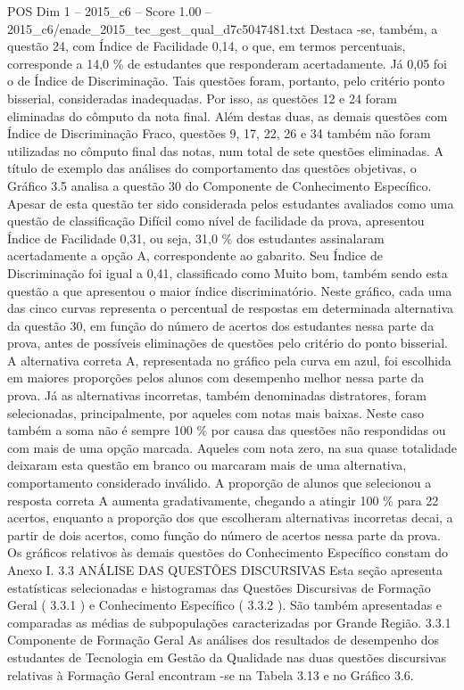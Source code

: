 \begin{textsample}{POS Dim 1 – 2015\_c6 – Score 1.00 – 2015\_c6/enade\_2015\_tec\_gest\_qual\_d7c5047481.txt}
Destaca -se, também, a questão 24, com Índice de Facilidade 0,14, o que, em termos percentuais, corresponde a 14,0 \% de estudantes que responderam acertadamente.
Já 0,05 foi o de Índice de Discriminação.
Tais questões foram, portanto, pelo critério ponto bisserial, consideradas inadequadas.
Por isso, as questões 12 e 24 foram eliminadas do cômputo da nota final.
Além destas duas, as demais questões com Índice de Discriminação Fraco, questões 9, 17, 22, 26 e 34 também não foram utilizadas no cômputo final das notas, num total de sete questões eliminadas.
A título de exemplo das análises do comportamento das questões objetivas, o Gráfico 3.5 analisa a questão 30 do Componente de Conhecimento Específico.
Apesar de esta questão ter sido considerada pelos estudantes avaliados como uma questão de classificação Difícil como nível de facilidade da prova, apresentou Índice de Facilidade 0,31, ou seja, 31,0 \% dos estudantes assinalaram acertadamente a opção A, correspondente ao gabarito.
Seu Índice de Discriminação foi igual a 0,41, classificado como Muito bom, também sendo esta questão a que apresentou o maior índice discriminatório.
Neste gráfico, cada uma das cinco curvas representa o percentual de respostas em determinada alternativa da questão 30, em função do número de acertos dos estudantes nessa parte da prova, antes de possíveis eliminações de questões pelo critério do ponto bisserial.
A alternativa correta A, representada no gráfico pela curva em azul, foi escolhida em maiores proporções pelos alunos com desempenho melhor nessa parte da prova.
Já as alternativas incorretas, também denominadas distratores, foram selecionadas, principalmente, por aqueles com notas mais baixas.
Neste caso também a soma não é sempre 100 \% por causa das questões não respondidas ou com mais de uma opção marcada.
Aqueles com nota zero, na sua quase totalidade deixaram esta questão em branco ou marcaram mais de uma alternativa, comportamento considerado inválido.
A proporção de alunos que selecionou a resposta correta A aumenta gradativamente, chegando a atingir 100 \% para 22 acertos, enquanto a proporção dos que escolheram alternativas incorretas decai, a partir de dois acertos, como função do número de acertos nessa parte da prova.
Os gráficos relativos às demais questões do Conhecimento Específico constam do Anexo I. 3.3 ANÁLISE DAS QUESTÕES DISCURSIVAS Esta seção apresenta estatísticas selecionadas e histogramas das Questões Discursivas de Formação Geral ( 3.3.1 ) e Conhecimento Específico ( 3.3.2 ).
São também apresentadas e comparadas as médias de subpopulações caracterizadas por Grande Região. 3.3.1 Componente de Formação Geral As análises dos resultados de desempenho dos estudantes de Tecnologia em Gestão da Qualidade nas duas questões discursivas relativas à Formação Geral encontram -se na Tabela 3.13 e no Gráfico 3.6.

\end{textsample}

